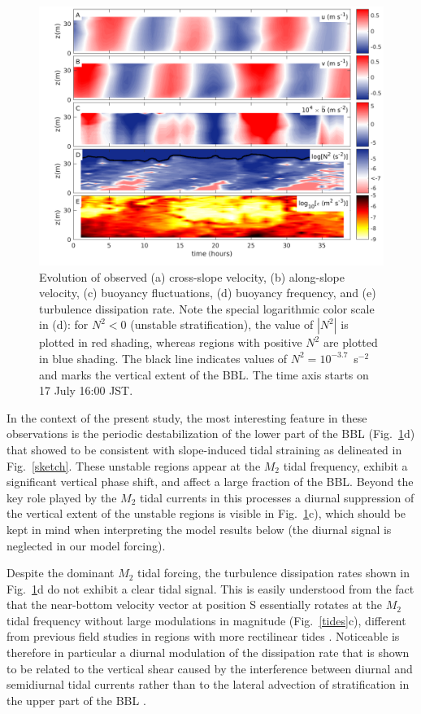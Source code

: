 \begin{figure}[ht]
  \noindent\includegraphics[width=40pc]{daten_teos10.png}
  \caption{Evolution of observed (a) cross-slope velocity, (b)
    along-slope velocity, (c) buoyancy fluctuations, (d) buoyancy
    frequency, and (e) turbulence dissipation rate. Note the special
    logarithmic color scale in (d): for $N^2 < 0$ (unstable
    stratification), the value of $| N^2 |$ is plotted in red shading,
    whereas regions with positive $N^2$ are plotted in blue
    shading. The black line indicates values of $N^2 = 10^{-3.7}$~s$^{-2}$ and 
    marks the vertical extent of the BBL. The time axis starts on 17 July 
    16:00 JST.}
  \label{fielddata}
\end{figure}

In the context of the present study, the most interesting feature in
these observations is the periodic destabilization of the lower part
of the BBL (Fig.\ \ref{fielddata}d) that \cite{Endohetal2016a} showed
to be consistent with slope-induced tidal straining as delineated in
Fig.\ \ref{sketch}. These unstable regions appear at the $M_2$ tidal
frequency, exhibit a significant vertical phase shift, and affect a
large fraction of the BBL. Beyond the key role played by the $M_2$
tidal currents in this processes a diurnal suppression of the vertical extent 
of 
the unstable regions is visible in Fig.\ \ref{fielddata}c), which should be 
kept in mind when interpreting the model results below (the diurnal signal is 
neglected in our model forcing).

Despite the dominant $M_2$ tidal forcing, the turbulence dissipation
rates shown in Fig.\ \ref{fielddata}d do not exhibit a clear tidal
signal. This is easily understood from the fact that the near-bottom
velocity vector at position S essentially rotates at the $M_2$ tidal
frequency without large modulations in magnitude (Fig.\ \ref{tides}c),
different from previous field studies in regions with more rectilinear
tides \citep[e.g.][]{Simpsonetal2002,Burchardetal2002a}. Noticeable is 
therefore 
in particular a diurnal modulation of the dissipation rate that is shown to be 
related to the vertical shear caused by the interference between diurnal and 
semidiurnal tidal currents rather than to the lateral advection of 
stratification in the upper part of the BBL \citep{Wakataetal2016a}.


